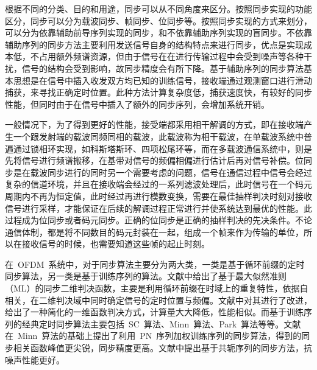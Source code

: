 根据不同的分类、目的和用途，同步可以从不同角度来区分。按照同步实现的功能区分，同步可以分为载波同步、帧同步、位同步等。按照同步实现的方式来划分，可以分为依靠辅助前导序列实现的同步，和不依靠辅助序列实现的盲同步。不依靠辅助序列的同步方法主要利用发送信号自身的结构特点来进行同步，优点是实现成本低，不占用额外频谱资源，但由于信号在在进行传输过程中会受到噪声等各种干扰，信号的结构会受到影响，故同步精度会有所下降。基于辅助序列的同步算法基本思想是在信号中插入收发双方均已知的训练信号，接收端通过观测窗口进行滑动捕获，来寻找正确定时位置。此种方法计算复杂度低，捕获速度快，有较好的同步性能，但同时由于在信号中插入了额外的同步序列，会增加系统开销。

一般情况下，为了得到更好的性能，接受端都采用相干解调的方式，即在接收端产生一个跟发射端的载波同频同相的载波，此载波称为相干载波，在单载波系统中普遍通过锁相环实现，如科斯塔斯环、四项松尾环等，而在多载波通信系统中，则是先将信号进行频谱搬移，在基带对信号的频偏相偏进行估计后再对信号补偿。位同步是在载波同步进行的同时另一个需要考虑的问题，信号在通信过程中信号会经过复杂的信道环境，并且在接收端会经过的一系列滤波处理后，此时信号在一个码元周期内不再为恒定值，此时经过再进行模数变换，需要在最佳抽样判决时刻对接收信号进行采样，才能保证在后续的解调过程正常进行并使系统达到最优的性能。此过程成为位同步或者码元同步。正确的位同步是正确的抽样判决的先决条件。不论通信体制，都是将不同数目的码元封装在一起，组成一个帧来作为传输的单位，所以在接收信号的时候，也需要知道这些帧的起止时刻。

在~OFDM~系统中，对于同步算法主要分为两大类，一类是基于循环前缀的定时同步算法，另一类是基于训练序列的算法。文献中给出了基于最大似然准则（ML）的同步二维判决函数，主要是利用循环前缀在时域上的重复特性，依据自相关，在二维判决域中同时确定信号的定时位置与频偏。文献中对其进行了改进，给出了一种简化的一维函数判决方式，计算量大大降低，性能相似。而基于训练序列的经典定时同步算法主要包括~SC~算法、Minn~算法、Park~算法等等。文献在~Minn~算法的基础上提出了利用~PN~序列加权训练序列的同步算法，得到的同步相关函数峰值更尖锐，同步精度更高。文献中提出基于共轭序列的同步方法，抗噪声性能更好。

